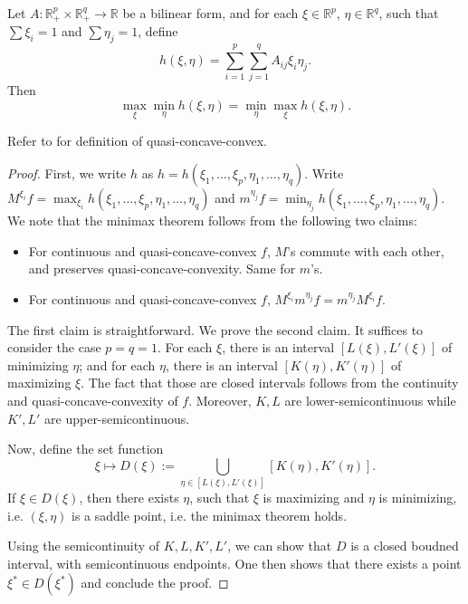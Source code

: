 \begin{theorem}
\label{thm:von-neumann-minimax}
Let $A: \mathbb{R}^p_+ \times \mathbb{R}^q_+ \to \mathbb{R}$ be a bilinear form, and for each $\xi \in \mathbb{R}^p$, $\eta \in \mathbb{R}^q$, such that $\sum \xi_i = 1$ and $\sum \eta_j = 1$, define
\[
h(\xi, \eta) = \sum_{i=1}^p \sum_{j=1}^q A_{ij} \xi_i \eta_j.
\]
Then
\[
    \max_{\xi} \min_{\eta} h(\xi, \eta) = \min_{\eta} \max_{\xi} h(\xi, \eta).
\]
\end{theorem}

Refer to \autocite{sionGeneralMinimax1958} for definition of quasi-concave-convex.

\begin{proof}
    First, we write $h$ as $h = h(\xi_1, \ldots, \xi_p, \eta_1, \ldots, \eta_q)$. Write $M^{\xi_i} f = \max_{\xi_i} h(\xi_1, \ldots, \xi_p, \eta_1, \ldots, \eta_q)$ and $m^{\eta_j} f = \min_{\eta_j} h(\xi_1, \ldots, \xi_p, \eta_1, \ldots, \eta_q)$. We note that the minimax theorem follows from the following two claims:
    
    \begin{itemize}
        \item For continuous and quasi-concave-convex $f$, $M$'s commute with each other, and preserves quasi-concave-convexity. Same for $m$'s.
        \item For continuous and quasi-concave-convex $f$, $M^{\xi_i} m^{\eta_j} f = m^{\eta_j} M^{\xi_i} f$.
    \end{itemize}
    The first claim is straightforward. We prove the second claim. It suffices to consider the case $p = q = 1$. For each $\xi$, there is an interval $[L(\xi), L'(\xi)]$ of minimizing $\eta$; and for each $\eta$, there is an interval $[K(\eta), K'(\eta)]$ of maximizing $\xi$. The fact that those are closed intervals follows from the continuity and quasi-concave-convexity of $f$. Moreover, $K, L$ are lower-semicontinuous while $K', L'$ are upper-semicontinuous. 

    Now, define the set function
    \[
    \xi \mapsto D(\xi) := \bigcup_{\eta \in [L(\xi), L'(\xi)]} [K(\eta), K'(\eta)].
    \]
    If $\xi \in D(\xi)$, then there exists $\eta$, such that $\xi$ is maximizing and $\eta$ is minimizing, i.e. $(\xi, \eta)$ is a saddle point, i.e. the minimax theorem holds.

    Using the semicontinuity of $K, L, K', L'$, we can show that $D$ is a closed boudned interval, with semicontinuous endpoints. One then shows that there exists a point $\xi^* \in D(\xi^*)$ and conclude the proof.
\end{proof}

